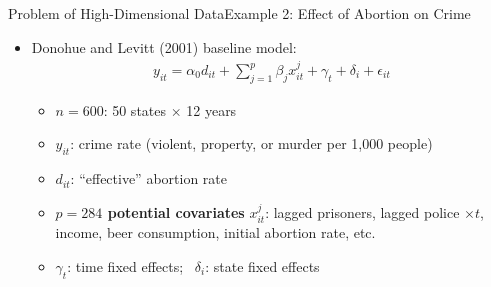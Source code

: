 \documentclass[dvipsnames,hyperref={pdfpagelabels=false}]{beamer}
\begin{document}
	\begin{frame}{Problem of High-Dimensional Data}{Example 2: Effect of Abortion on Crime}
    \begin{itemize}
        \item Donohue and Levitt (2001) baseline model:
        \begin{eqnarray*}
            y_{it} = \alpha_{0} d_{it} + \sum^{p}_{j=1} \beta_{j} 
            x^{j}_{it} + \gamma_{t} + \delta_{i} + \epsilon_{it}
        \end{eqnarray*}
        \begin{itemize}
            \item $n = 600$: 50 states $\times$ 12 years
            \vspace{0.1cm}
            \item $y_{it}$: crime rate (violent, property, or murder 
            per 1,000 people)
            \vspace{0.1cm}
            \item $d_{it}$: ``effective'' abortion rate
            \vspace{0.1cm}
            \item \textbf{$p = 284$ potential covariates} $x^{j}_{it}$: 
            lagged prisoners, lagged police $\times t$, income, 
            beer consumption, initial abortion rate, etc.
            \vspace{0.1cm}
            \item $\gamma_{t}$: time fixed effects; \ 
            $\delta_{i}$: state fixed effects
        \end{itemize}
    \end{itemize}
\end{frame}
	
	
	
\end{document}
